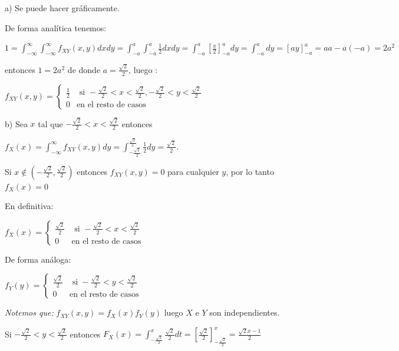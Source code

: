 \documentclass[12pt]{report}
\begin{document}
     a) Se puede hacer gráficamente.

    De forma analítica tenemos:

    $1=\int_{-\infty}^\infty\int_{-\infty}^\infty f_{XY}(x,y) dx dy=
    \int_{-a}^a\int_{-a}^a \frac{1}{2} dx dy=  \int_{-a}^a
    [\frac{x}{2}]_{-a}^a dy = \int_{-a}^a dy = [a y ]_{-a}^a = a a -
    a (-a )= 2 a ^2$

    entonces $1=2a^2$ de donde $a=\frac{\sqrt{2}}{2}$, luego :

      $f_{XY}(x,y)=\left\{\begin{array}{ll}
      \frac{1}{2} & \mbox{ si } -\frac{\sqrt{2}}{2}<x<\frac{\sqrt{2}}{2},
      -\frac{\sqrt{2}}{2}<y<\frac{\sqrt{2}}{2}\\
      0 & \mbox{en el resto de casos}
      \end{array}\right.$

    b) Sea $x$ tal que $-\frac{\sqrt{2}}{2}<x<\frac{\sqrt{2}}{2}$
    entonces

    $f_{X}(x)=\int_{-\infty}^{\infty} f_{XY}(x,y) dy =
    \int_{-\frac{\sqrt{2}}{2}}^{\frac{\sqrt{2}}{2}}
    \frac{1}{2} dy = \frac{\sqrt{2}}{2}.$

    Si $x\not\in (-\frac{\sqrt{2}}{2},\frac{\sqrt{2}}{2})$ entonces
    $f_{XY}(x,y)=0$ para cualquier $y$, por lo tanto $f_{X}(x)=0$

    En definitiva:

    $f_{X}(x)=\left\{\begin{array}{ll}
      \frac{\sqrt{2}}{2} & \mbox{ si } -\frac{\sqrt{2}}{2}<x<\frac{\sqrt{2}}{2}
      \\
      0 & \mbox{en el resto de casos}
      \end{array}\right.$

      De forma análoga:

       $f_{Y}(y)=\left\{\begin{array}{ll}
      \frac{\sqrt{2}}{2} & \mbox{ si } -\frac{\sqrt{2}}{2}<y<\frac{\sqrt{2}}{2}
      \\
      0 & \mbox{en el resto de casos}
      \end{array}\right.$


      \emph{Notemos que:} $f_{XY}(x,y)=f_{X}(x) f_{Y}(y)$ luego $X$ e
      $Y$ son independientes.



    Si $ -\frac{\sqrt{2}}{2}<y<\frac{\sqrt{2}}{2}$ entonces
    $F_{X}(x)=\int_{-\frac{\sqrt{2}}{2} }^x \frac{\sqrt{2}}{2} dt =
     [\frac{\sqrt{2}}{2}]_{-\frac{\sqrt{2}}{2} }^x = \frac{\sqrt{2} x
     -1}{2}$
\end{document}
